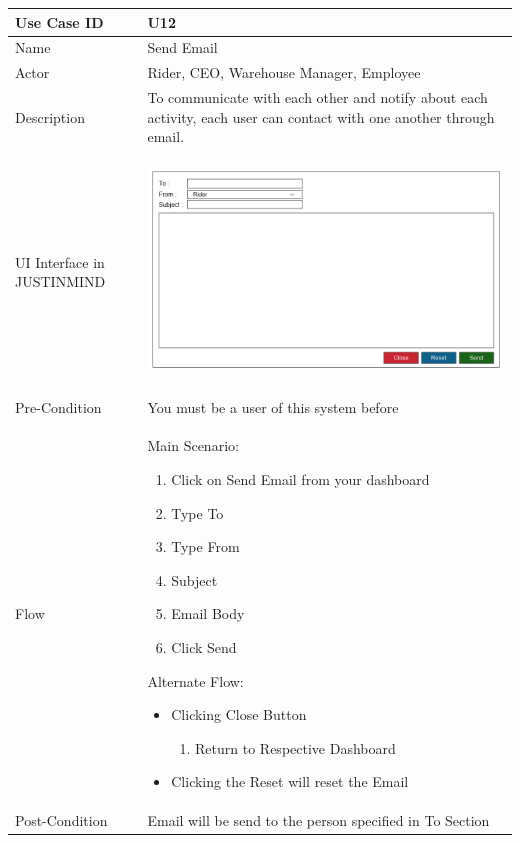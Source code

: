 \documentclass[12pt,a4paper]{report}
\begin{document}
\begin{tabular}{ | m{3cm} | m{12cm}| } \hline

Use Case ID &  U12 \\\hline

Name  	    &  Send Email \\ \hline

Actor     	&  Rider, CEO, Warehouse Manager, Employee \\ \hline

Description & To communicate with each other and notify about each activity, each user can contact with one another through email. \\ \hline

UI Interface in JUSTINMIND & \begin{center} \includegraphics[scale=0.3]{./UIs for Latex Reports/UI-013 SendEmail@1x.png}\end{center}  \\ \hline

Pre-Condition & You must be a user of this system before  \\ \hline


Flow & Main Scenario:

\begin{enumerate}
\item   Click on Send Email from your dashboard
\item   Type To
\item   Type From
\item   Subject
\item   Email Body
\item   Click Send


\end{enumerate}

Alternate Flow:

\begin{itemize}
\item 	Clicking Close Button
	\begin{enumerate}
		\item 	Return to Respective Dashboard
	\end{enumerate}
\item Clicking the Reset will reset the Email
\end{itemize}
\\ \hline
Post-Condition & Email will be send to the person specified in To Section   \\ \hline

\end{tabular}
\end{document}

